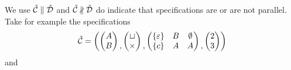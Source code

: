 We use $\check{\mathcal{C}} \parallel \check{\mathcal{D}}$ and $\check{\mathcal{C}} \nparallel \check{\mathcal{D}}$ do indicate that specifications are or are not parallel. Take for example the specifications
\[
    \check{\mathcal{C}} = \left(
    \begin{pmatrix}
        A\\B    
    \end{pmatrix}
    \begin{matrix}\\,\end{matrix}
    \begin{pmatrix}
        \sqcup\\
        \times
    \end{pmatrix}
    \begin{matrix}\\,\end{matrix}
    \begin{pmatrix}
        \left\{\varepsilon\right\} & B & \emptyset\\
        \left\{c\right\} & A & A
    \end{pmatrix}
    \begin{matrix}\\,\end{matrix}
    \begin{pmatrix}
        2\\3
    \end{pmatrix}
    \right)
\]
and
